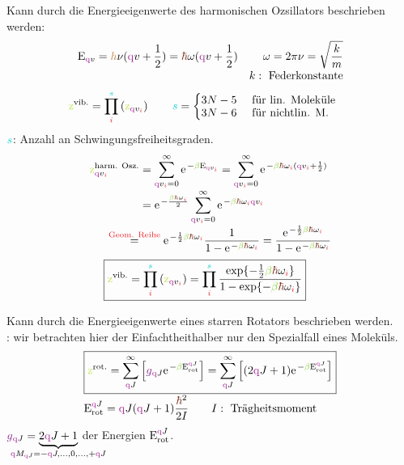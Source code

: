 \begin{sectionbox}\nospacing
  Kann durch die Energieeigenwerte des harmonischen Ozsillators beschrieben werden:
  \begin{align*}
    \Ez_{\vqz}=\hp\nu(\vqz+\frac{1}{2})=\hpr\omega(\vqz+\frac{1}{2})&&\omega=2\pi\nu=\sqrt{\frac{k}{m}}\nalign
    &&k:\text{ Federkonstante}
  \end{align*}
  \begin{align*}
    \zzvib&=\prod_{\idxi}^{\idxs}\left(\zz_{\vqz_{\idxi}}\right)\qquad
            \idxs=\begin{cases}
              3N-5 &\text{ für lin. Moleküle }\nalign
              3N-6 &\text{ für nichtlin. M.}
                  \end{cases}
  \end{align*}
  $\idxs$: Anzahl an Schwingungsfreiheitsgraden.
  \begin{align*}
  \zz_{\vqz_{\idxi}}^{\text{harm. Osz.}}&=\sum_{\vqz_{\idxi}=0}^{\infty}\e^{-\betac\Ez_{\vqz_{\idxi}}}=\sum_{\vqz_{\idxi}=0}^{\infty}\e^{-\betac\hpr\omega_{\idxi}(\vqz_{\idxi}+\frac{1}{2})}\nalign
    &=\e^{-\frac{\betac\hpr\omega_{\idxi}}{2}}\sum_{\vqz_{\idxi}=0}^{\infty}\e^{-\betac\hpr\omega_{\idxi}\vqz_{\idxi}}\nalign
    &\hspace{-3em}\eqs{\rd{\text{Geom. Reihe}}}\e^{-\frac{1}{2}\betac\hpr\omega_{\idxi}}\frac{1}{1-\e^{-\betac\hpr\omega_{\idxi}}}=\frac{\e^{-\frac{1}{2}\betac\hpr\omega_{\idxi}}}{1-\e^{-\betac\hpr\omega_{\idxi}}}
  \end{align*}
  \begin{align}
    \Aboxed{\zzvib&=\prod_{\idxi}^{\idxs}\left(\zz_{\vqz_{\idxi}}\right)=\prod_{\idxi}^{\idxs}\frac{\exp\{-\frac{1}{2}\betac\hpr\omega_{\idxi}\}}{1-\exp\{-\betac\hpr\omega_{\idxi}\}}}
  \end{align}
\end{sectionbox}
\begin{sectionbox}\nospacing
    Kann durch die Energieeigenwerte eines starren Rotators
    beschrieben werden.\\
    : wir betrachten hier der Einfachtheithalber nur den Spezialfall eines  Moleküls.
    \begin{align*}
      &\boxed{\zzrot=\sum_{\Jqz}^{\infty}\left[\gfact_{\Jqz}\e^{-\betac\Ez_{\text{rot}}^{\Jqz}}\right]=\sum_{\Jqz}^{\infty}\left[(2\Jqz+1)\e^{-\betac\Ez_{\text{rot}}^{\Jqz}}\right]}\nalign
      &\Ez_{\text{rot}}^{\Jqz}=\Jqz(\Jqz+1)\frac{\hpr^2}{2I}\qquad I:\text{ Trägheitsmoment}
    \end{align*}
     $\gfact_{\Jqz}=\underbrace{2\Jqz+1}_{\mathclap{\qz{M}_{\Jqz}=-\Jqz,\ldots,0,\ldots,+\Jqz}}$ der Energien $\Ez_{\text{rot}}^{\Jqz}$.
\end{sectionbox}
